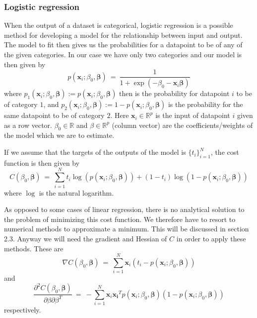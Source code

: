 \documentclass[a4paper,english]{article}
\begin{document}
\subsubsection{Logistic regression}
When the output of a dataset is categorical, logistic
regression is a possible method for developing a model for the 
relationship between input and output. 
The model to fit then gives us the probabilities for a datapoint to be of 
any of the given categories. In our case we have only two categories 
and our model is then given by
\begin{equation}
    p(\bm{x}_i; \beta_0, \bm{\beta}) 
    \ = \ \frac{1}{1 + \exp(- \beta_0 - \bm{x}_i\bm{\beta})}
\end{equation}
where 
$p_1(\bm{x}_i; \beta_0, \bm{\beta}) := p(\bm{x}_i; \beta_0, \bm{\beta})$ 
then is the probability 
for datapoint $i$ to be of category $1$, and 
$p_2(\bm{x}_i; \beta_0, \bm{\beta}) := 1 -p(\bm{x}_i; \beta_0, \bm{\beta})$ 
is the probability for the same datapoint to be of category $2$.
Here $\bm{x}_i \in \mathbb{R}^p$ is the input of datapoint $i$ given
as a row vector. 
$\beta_0 \in \mathbb{R}$ and $\beta \in \mathbb{R}^p$ (column vector) 
are the coefficients/weights of the model which we are to estimate.
\par
If we assume that the targets of the outputs of the model is 
$\{t_i\}_{i=1}^N$, the cost function is then given by 
\begin{equation}
    C(\beta_0, \bm{\beta}) \ = \
    \sum_{i=1}^N t_i \log(p(\bm{x}_i; \beta_0, \bm{\beta})) + 
    (1 - t_i) \log(1- p(\bm{x}_i; \beta_0, \bm{\beta}))
\end{equation}
where $\log$ is the natural logarithm.
\par
As opposed to some cases of linear regression, there is no analytical
solution to the problem of minimizing this cost function. We therefore
have to resort to numerical methods to approximate a minimum. This will
be discussed in section 2.3. Anyway we will need the gradient and Hessian
of $C$ in order to apply these methods. These are
\begin{equation}
    \nabla C(\beta_0, \bm{\beta}) \ = \
    \sum_{i=1}^N \bm{x}_i(t_i - p(\bm{x}_i; \beta_0, \bm{\beta}))
\end{equation}
and
\begin{equation}
    \frac{\partial^2 C(\beta_0, \bm{\beta})}
    {\partial \beta \partial \beta^T} \ = \
    - \sum_{i=1}^N \bm{x}_i \bm{x_i}^T 
    p(\bm{x}_i; \beta_0, \bm{\beta})(1 - p(\bm{x}_i; \beta_0, \bm{\beta}))
\end{equation}
respectively.
\end{document}
